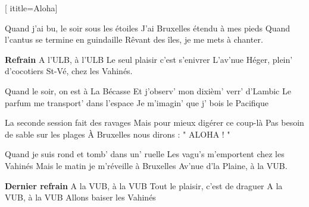 [
  ititle={Aloha}]


\beginverse
Quand j'ai bu, le soir sous les étoiles
J'ai Bruxelles étendu à mes pieds
Quand l'cantus se termine en guindaille
Rêvant des îles, je me mets à chanter.
\endverse

\beginchorus
\textbf{Refrain}
A l'ULB, à l'ULB
Le seul plaisir c'est s'enivrer
L'av'nue Héger, plein' d'cocotiers
St-Vé, chez les Vahinés.
\endchorus

\beginverse
Quand le soir, on est à La Bécasse
Et j'observ' mon dixièm' verr' d'Lambic
Le parfum me transport' dans l'espace
Je m'imagin' que j' bois le Pacifique
\endverse

\beginverse
La seconde session fait des ravages
Mais pour mieux digérer ce coup-là
Pas besoin de sable sur les plages
À Bruxelles nous dirons : " ALOHA ! "
\endverse

\beginverse
Quand je suis rond et tomb' dans un' ruelle
Les vagu's m'emportent chez les Vahinés
Mais le matin je m'réveille à Bruxelles
Av'nue d'la Plaine, à la VUB.
\endverse

\beginchorus
\textbf{Dernier refrain}
A la VUB, à la VUB
Tout le plaisir, c'est de draguer
A la VUB, à la VUB
Allons baiser les Vahinés
\endchorus

\endsong
